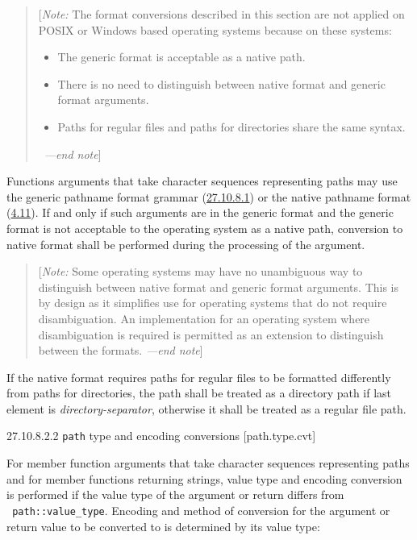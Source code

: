 \begin{quote}
{[}\emph{Note:} The format conversions described in this section are not
applied on POSIX or Windows based operating systems because on these
systems:

\begin{itemize}
\tightlist
\item
  The generic format is acceptable as a native path.
\item
  There is no need to distinguish between native format and generic
  format arguments.
\item
  Paths for regular files and paths for directories share the same
  syntax.
\end{itemize}

~\emph{---end note}{]}
\end{quote}

Functions arguments that take character sequences representing paths may
use the generic pathname format grammar
(\hyperref[path.generic]{27.10.8.1}) or the native pathname format
(\hyperref[fs.def.native]{4.11}). If and only if such arguments are in
the generic format and the generic format is not acceptable to the
operating system as a native path, conversion to native format shall be
performed during the processing of the argument.

\begin{quote}
{[}\emph{Note:} Some operating systems may have no unambiguous way to
distinguish between native format and generic format arguments. This is
by design as it simplifies use for operating systems that do not require
disambiguation. An implementation for an operating system where
disambiguation is required is permitted as an extension to distinguish
between the formats. \emph{---end note}{]}
\end{quote}

If the native format requires paths for regular files to be formatted
differently from paths for directories, the path shall be treated as a
directory path if last element is \emph{directory-separator}, otherwise
it shall be treated as a regular file path.

27.10.8.2.2 \texttt{path} type and encoding conversions
{[}path.type.cvt{]}

For member function arguments that take character sequences representing
paths and for member functions returning strings, value type and
encoding conversion is performed if the value type of the argument or
return differs from \texttt{\ path::value\_type}. Encoding and method of
conversion for the argument or return value to be converted to is
determined by its value type:

